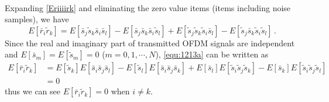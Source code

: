 \begin{equation}
\begin{split}
\end{split}
\label{Eriiiirk}
\end{equation}
Expanding \eqref{Eriiiirk} and eliminating the zero value items (items including noise samples), we have 
 \begin{equation}
   E[\bar{r}_i\tilde{r}_k] = E[\bar{s}_j\tilde{s}_k\bar{s}_i\bar{s}_l] -  E[\bar{s}_j\bar{s}_k\bar{s}_i\tilde{s}_l] + E[\tilde{s}_j\tilde{s}_k\tilde{s}_i\bar{s}_l] - E[\tilde{s}_j\bar{s}_k\tilde{s}_i\tilde{s}_l]\,.
   \label{equ:1213a}
\end{equation}
Since the real and imaginary part of transmitted OFDM signals are independent and $E[\bar{s}_m] = E[\tilde{s}_m] = 0$ ($m = 0, 1, \cdots, N$), \eqref{equ:1213a} can be written as
\begin{equation}
  \begin{split}
  E[\bar{r}_i\tilde{r}_k] &= E[\tilde{s}_k]E[\bar{s}_i\bar{s}_j\bar{s}_l]  - E[\tilde{s}_l]E[\bar{s}_i\bar{s}_j\bar{s}_k] + E[\bar{s}_l]E[\tilde{s}_i\tilde{s}_j\tilde{s}_k] -  E[\bar{s}_k]E[\tilde{s}_i\tilde{s}_j\tilde{s}_l]\\
  &= 0
\end{split}
  \label{equ:1215m}
\end{equation}
thus we can see $E[\bar{r}_i\tilde{r}_k] = 0$  when $i \neq k $.  

